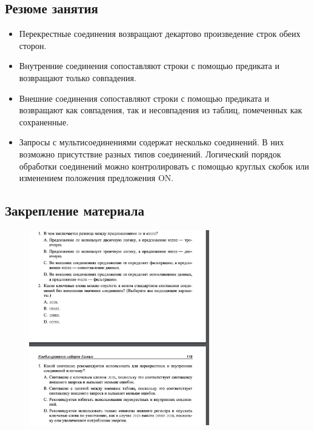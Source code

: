\subsection*{Резюме занятия}
\begin{itemize}
	\item Перекрестные соединения возвращают декартово произведение строк обеих сторон. 
	\item Внутренние соединения сопоставляют строки с помощью предиката и возвращают только совпадения.
	\item Внешние соединения сопоставляют строки с помощью предиката и возвращают
	как совпадения, так и несовпадения из таблиц, помеченных как сохраненные.
	\item Запросы с мультисоединениями содержат несколько соединений. В них возможно присутствие разных типов соединений. Логический порядок обработки соединений можно контролировать с помощью круглых скобок или изменением
	положения предложения ON. 
\end{itemize}

\subsection*{Закрепление материала}

\begin{figure}[h!]
	\begin{center}
		\includegraphics[width=0.7\textwidth]{img/zakrep8.png}
	\end{center}
	\captionsetup{justification=centering}
\end{figure}
\newpage

